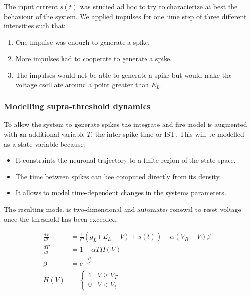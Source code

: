 		The input current $s(t)$ was studied ad hoc to try to characterize at best the behaviour of the system.
		We applied impulses for one time step of three different intensities such that:

		\begin{enumerate}
			\item One impulse was enough to generate a spike.
			\item More impulses had to cooperate to generate a spike.
			\item The impulses would not be able to generate a spike but would make the voltage oscillate around a point greater than $E_L$.
		\end{enumerate}

		\subsubsection{Modelling supra-threshold dynamics}
		To allow the system to generate spikes the integrate and fire model is augmented with an additional variable $T$, the inter-spike time or IST.
		This will be modelled as a state variable because:

		\begin{itemize}
			\item It constraints the neuronal trajectory to a finite region of the state space.
			\item The time between spikes can bee computed directly from its density.
			\item It allows to model time-dependent changes in the systems parameters.
		\end{itemize}

		The resulting model is two-dimensional and automates renewal to reset voltage once the threshold has been exceeded.


		\begin{equation}
			\begin{aligned}
				\frac{dV}{dt} &= \frac{1}{C}(g_L(E_L-V)+s(t)) + \alpha(V_R-V)\beta\\
				\frac{dT}{dt} &= 1-\alpha TH(V)\\
				\beta &=e^{-\frac{T^2}{2\gamma^2}}\\
				H(V) &= \begin{cases}1 & V\ge V_T\\0&V < V_t\end{cases}
				\label{eqs:supra-threshold}
			\end{aligned}
		\end{equation}

